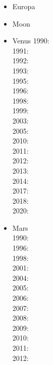 \begin{itemize}
\item Europa 
{\scriptsize
\cite{shha04,shha05,mish05,hash08}\cite{hash10}\cite{hash11,kast14,almc19}
}
\item Moon 
{\scriptsize
\cite{elvh02}\cite{elhg04}\cite{devv10}\cite{dejv13} \cite{zhdv19}
} 
\item Venus 
{\scriptsize
1990: \cite{scbg90,ogaw00}\\
1991: \cite{lekb91}\\
1992: \cite{kiha92,sqjs92}\\
1993: \cite{kief93,lekb93,ogaw93}\\
1995: \cite{lekb95,mopa95}\\
1996: \cite{somo96}\\
1998: \cite{mazk98}\cite{resm98}\cite{moso98}\cite{phha98}\\
1999: \cite{resm99}\\
2003: \cite{vesh03}\\
2005: \cite{vavv05}\\
2010: \cite{stfh10}\\
2011: \cite{orso11}\\
2012: \cite{arta12}\\
2013: \cite{huyz13}\\
2014: \cite{gita14}\cite{gery14b}\\
2017: \cite{cram17}\cite{dast17}\\
2018: \cite{king18}\\
2020: \cite{weki20}
}
\item Mars \\
{\scriptsize
1990: \cite{scbg90}\\
1996: \cite{hach96}\\
1998: \cite{resm98}\\
2001: \cite{nist01}\\
2004: \cite{lenm04}\cite{vavv04c}\\
2005: \cite{vavv05}\cite{onml05}\\
2006: \cite{losh06,rozh06,keso06}\\
2007: \cite{rozh07}\\
2008: \cite{loha08}\\
2009: \cite{keta09,zhon09,rolm09,keso09}\\
2010: \cite{srzh10}\\
2011: \cite{gokg11}\\
2012: \cite{srzh12}\cite{roar12}\\
}
\end{itemize}
